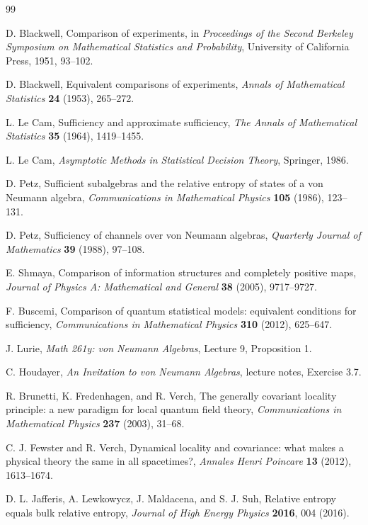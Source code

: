 \documentclass[12pt]{article}
\theoremstyle{definition}
\theoremstyle{remark}
\begin{document}
\begin{thebibliography}{99}

D. Blackwell,
Comparison of experiments,
in \emph{Proceedings of the Second Berkeley Symposium on Mathematical
Statistics and Probability}, University of California Press, 1951, 93--102.

D. Blackwell,
Equivalent comparisons of experiments,
\emph{Annals of Mathematical Statistics} \textbf{24} (1953), 265--272.

L. Le Cam,
Sufficiency and approximate sufficiency,
\emph{The Annals of Mathematical Statistics} \textbf{35} (1964), 1419--1455.

L. Le Cam,
\emph{Asymptotic Methods in Statistical Decision Theory},
Springer, 1986.

D. Petz,
Sufficient subalgebras and the relative entropy of states of a von Neumann
algebra,
\emph{Communications in Mathematical Physics} \textbf{105} (1986), 123--131.

D. Petz,
Sufficiency of channels over von Neumann algebras,
\emph{Quarterly Journal of Mathematics} \textbf{39} (1988), 97--108.

E. Shmaya,
Comparison of information structures and completely positive maps,
\emph{Journal of Physics A: Mathematical and General} \textbf{38} (2005),
9717--9727.

F. Buscemi,
Comparison of quantum statistical models: equivalent conditions for
sufficiency,
\emph{Communications in Mathematical Physics} \textbf{310} (2012), 625--647.

J. Lurie,
\emph{Math 261y: von Neumann Algebras}, Lecture 9, Proposition 1.

C. Houdayer,
\emph{An Invitation to von Neumann Algebras}, lecture notes, Exercise 3.7.

R. Brunetti, K. Fredenhagen, and R. Verch,
The generally covariant locality principle: a new paradigm for local quantum
field theory,
\emph{Communications in Mathematical Physics} \textbf{237} (2003), 31--68.

C. J. Fewster and R. Verch,
Dynamical locality and covariance: what makes a physical theory the same in
all spacetimes?,
\emph{Annales Henri Poincare} \textbf{13} (2012), 1613--1674.

D. L. Jafferis, A. Lewkowycz, J. Maldacena, and S. J. Suh,
Relative entropy equals bulk relative entropy,
\emph{Journal of High Energy Physics} \textbf{2016}, 004 (2016).

\end{thebibliography}
\end{document}
